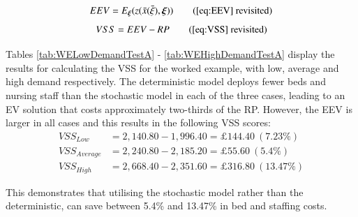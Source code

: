 \documentclass[../thesis.tex]{subfiles}
\begin{document}
\begin{equation}
    EEV = E_{\boldsymbol{\xi}} (z(\bar x (\bar \xi),\boldsymbol{\xi})) \tag{\ref{eq:EEV} revisited}
\end{equation}
\begin{equation}
    VSS = EEV - RP\tag{\ref{eq:VSS} revisited}
\end{equation}

Tables \ref{tab:WELowDemandTestA} - \ref{tab:WEHighDemandTestA} display the results for calculating the VSS for the worked example, with low, average and high demand respectively. The deterministic model deploys fewer beds and nursing staff than the stochastic model in each of the three cases, leading to an EV solution that costs approximately two-thirds of the RP. However, the EEV is larger in all cases and this results in the following VSS scores:
\begin{align}
    VSS_{Low} &= 2,140.80 - 1,996.40 = \pounds144.40 \ (7.23\%)\\
    VSS_{Average} &= 2,240.80 - 2,185.20 = \pounds55.60 \ (5.4\%)\\
    VSS_{High} &= 2,668.40 - 2,351.60 = \pounds316.80 \ (13.47\%)
\end{align}

This demonstrates that utilising the stochastic model rather than the deterministic, can save between 5.4\% and 13.47\% in bed and staffing costs.
\begin{table}[h!]
    \centering{}
    \caption{Test A results for the worked example using low daily bed demand values, with results recorded in the form [(beds), (staff)].}
    \label{tab:WELowDemandTestA}
\end{table}
\end{document}
